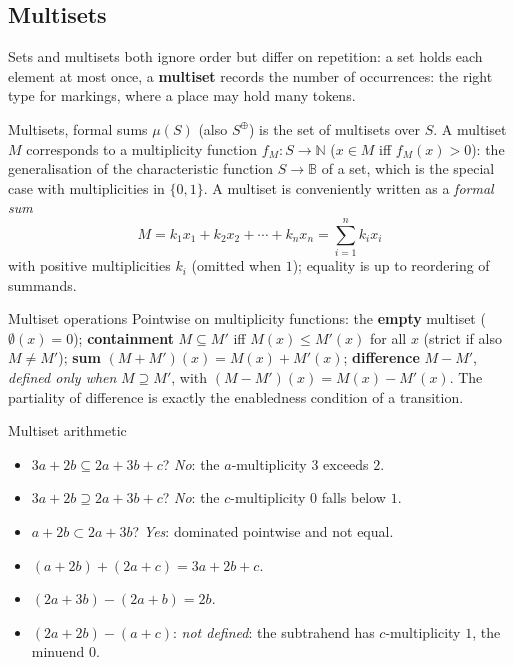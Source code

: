 \subsection{Multisets}

Sets and multisets both ignore order but differ on repetition: a set holds each element at most once, a \textbf{multiset} records the number of occurrences: the right type for markings, where a place may hold many tokens.

\begin{definitionbox}{Multisets, formal sums}
$\mu(S)$ (also $S^{\oplus}$) is the set of multisets over $S$. A multiset $M$ corresponds to a multiplicity function $f_M : S \to \mathbb{N}$ ($x \in M$ iff $f_M(x) > 0$): the generalisation of the characteristic function $S \to \mathbb{B}$ of a set, which is the special case with multiplicities in $\{0,1\}$. A multiset is conveniently written as a \emph{formal sum}
\[
  M = k_1 x_1 + k_2 x_2 + \cdots + k_n x_n = \sum_{i=1}^{n} k_i x_i
\]
with positive multiplicities $k_i$ (omitted when $1$); equality is up to reordering of summands.
\end{definitionbox}

\begin{definitionbox}{Multiset operations}
Pointwise on multiplicity functions: the \textbf{empty} multiset ($\emptyset(x) = 0$); \textbf{containment} $M \subseteq M'$ iff $M(x) \leq M'(x)$ for all $x$ (strict if also $M \neq M'$); \textbf{sum} $(M + M')(x) = M(x) + M'(x)$; \textbf{difference} $M - M'$, \emph{defined only when} $M \supseteq M'$, with $(M - M')(x) = M(x) - M'(x)$. The partiality of difference is exactly the enabledness condition of a transition.
\end{definitionbox}

\begin{examplebox}{Multiset arithmetic}
\begin{itemize}
  \item $3a + 2b \subseteq 2a + 3b + c$? \emph{No}: the $a$-multiplicity $3$ exceeds $2$.
  \item $3a + 2b \supseteq 2a + 3b + c$? \emph{No}: the $c$-multiplicity $0$ falls below $1$.
  \item $a + 2b \subset 2a + 3b$? \emph{Yes}: dominated pointwise and not equal.
  \item $(a + 2b) + (2a + c) = 3a + 2b + c$.
  \item $(2a + 3b) - (2a + b) = 2b$.
  \item $(2a + 2b) - (a + c)$: \emph{not defined}: the subtrahend has $c$-multiplicity $1$, the minuend $0$.
\end{itemize}
\end{examplebox}

